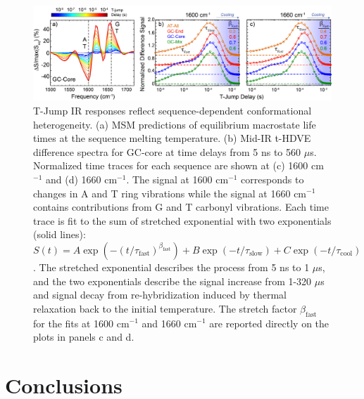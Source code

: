 \documentclass[journal=jpcbfk,manuscript=article]{achemso}
\begin{document}
\begin{figure}[ht!]
	\begin{center} 
        \includegraphics[width=1.0\textwidth]{Fig5.pdf}
        \caption{T-Jump IR responses reflect sequence-dependent conformational heterogeneity. (a) MSM predictions of equilibrium macrostate life times at the sequence melting temperature. (b) Mid-IR t-HDVE difference spectra for GC-core at time delays from 5 ns to 560 $\mu$s. Normalized time traces for each sequence are shown at (c) 1600 cm$^{-1}$ and (d) 1660 cm$^{-1}$. The signal at 1600 cm$^{-1}$ corresponds to changes in A and T ring vibrations while the signal at 1660 cm$^{-1}$ contains contributions from G and T carbonyl vibrations. Each time trace is fit to the sum of stretched exponential with two exponentials (solid lines): $S(t) = A\exp{(-(t/\tau_{\mathrm{fast}})^{\beta_\mathrm{fast}})} + B\exp{(-t/\tau_{\mathrm{slow}})}+C\exp{(-t/\tau_{\mathrm{cool}})}$. The stretched exponential describes the process from 5 ns to 1 $\mu$s, and the two exponentials describe the signal increase from 1-320 $\mu$s and signal decay from re-hybridization induced by thermal relaxation back to the initial temperature. The stretch factor $\beta_\mathrm{fast}$ for the fits at 1600 cm$^{-1}$ and 1660 cm$^{-1}$ are reported directly on the plots in panels c and d.
        }
        \label{fig:T-jump_stretching}
	\end{center}
\end{figure}

   
 
   



\section{\label{sec:conc}Conclusions}
\end{document}
